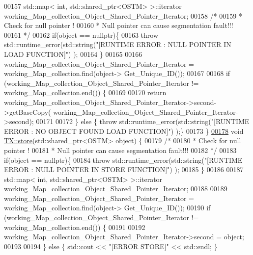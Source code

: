 \begin{DoxyCode}
00157     std::map< int, std::shared\_ptr<OSTM> >::iterator working\_Map\_collection\_Object\_Shared\_Pointer\_Iterator;
00158     \textcolor{comment}{/*}
00159 \textcolor{comment}{     * Check for null pointer !}
00160 \textcolor{comment}{     * Null pointer can cause segmentation fault!!!}
00161 \textcolor{comment}{     */}
00162     \textcolor{keywordflow}{if}(\textcolor{keywordtype}{object} == \textcolor{keyword}{nullptr})\{
00163         \textcolor{keywordflow}{throw} std::runtime\_error(std::string(\textcolor{stringliteral}{"[RUNTIME ERROR : NULL POINTER IN LOAD FUNCTION]"}) );
00164     \}
00165 
00166         working\_Map\_collection\_Object\_Shared\_Pointer\_Iterator = working\_Map\_collection.find(object->
      Get\_Unique\_ID());
00167 
00168     \textcolor{keywordflow}{if} (working\_Map\_collection\_Object\_Shared\_Pointer\_Iterator != working\_Map\_collection.end()) \{
00169 
00170         \textcolor{keywordflow}{return} working\_Map\_collection\_Object\_Shared\_Pointer\_Iterator->second->getBaseCopy(
      working\_Map\_collection\_Object\_Shared\_Pointer\_Iterator->second);
00171         
00172     \} \textcolor{keywordflow}{else} \{ \textcolor{keywordflow}{throw} std::runtime\_error(std::string(\textcolor{stringliteral}{"[RUNTIME ERROR : NO OBJECT FOUND LOAD FUNCTION]"}) );\}
00173 \}
\hypertarget{_t_x_8cpp_source.tex_l00178}{}\hyperlink{class_t_x_a7dbcb369aa4a3370b6c6829d278ece5d}{00178} \textcolor{keywordtype}{void} \hyperlink{class_t_x_a7dbcb369aa4a3370b6c6829d278ece5d}{TX::store}(std::shared\_ptr<OSTM> \textcolor{keywordtype}{object}) \{
00179     \textcolor{comment}{/*}
00180 \textcolor{comment}{     * Check for null pointer !}
00181 \textcolor{comment}{     * Null pointer can cause segmentation fault!!!}
00182 \textcolor{comment}{     */}
00183     \textcolor{keywordflow}{if}(\textcolor{keywordtype}{object} == \textcolor{keyword}{nullptr})\{
00184         \textcolor{keywordflow}{throw} std::runtime\_error(std::string(\textcolor{stringliteral}{"[RUNTIME ERROR : NULL POINTER IN STORE FUNCTION]"}) );
00185     \}
00186     
00187     std::map< int, std::shared\_ptr<OSTM> >::iterator working\_Map\_collection\_Object\_Shared\_Pointer\_Iterator;
00188 
00189     working\_Map\_collection\_Object\_Shared\_Pointer\_Iterator = working\_Map\_collection.find(object->
      Get\_Unique\_ID());
00190     \textcolor{keywordflow}{if} (working\_Map\_collection\_Object\_Shared\_Pointer\_Iterator != working\_Map\_collection.end()) \{
00191 
00192         working\_Map\_collection\_Object\_Shared\_Pointer\_Iterator->second = object;
00193 
00194     \} \textcolor{keywordflow}{else} \{ std::cout << \textcolor{stringliteral}{"[ERROR STORE]"} << std::endl; \}

\end{DoxyCode}

